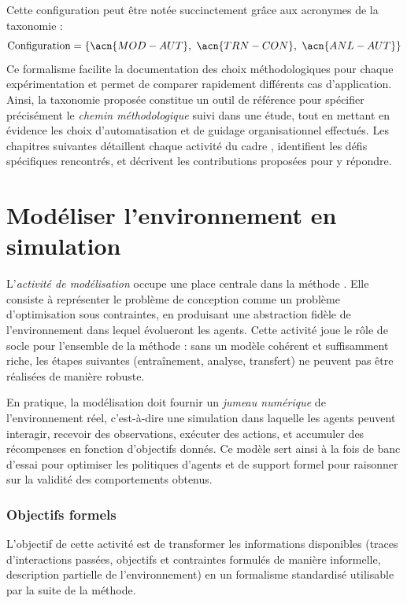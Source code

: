 Cette configuration peut être notée succinctement grâce aux acronymes de la taxonomie :
\[
  \text{Configuration} = \{\acn{MOD-AUT},\ \acn{TRN-CON},\ \acn{ANL-AUT}\}
\]
Ce formalisme facilite la documentation des choix méthodologiques pour chaque expérimentation et permet de comparer rapidement différents cas d'application.
%
Ainsi, la taxonomie proposée constitue un outil de référence pour spécifier précisément le \textit{chemin méthodologique} suivi dans une étude, tout en mettant en évidence les choix d'automatisation et de guidage organisationnel effectués.
Les chapitres suivantes détaillent chaque activité du cadre , identifient les défis spécifiques rencontrés, et décrivent les contributions proposées pour y répondre.


\clearpage
\thispagestyle{empty}
\null
\newpage


\chapter{Modéliser l'environnement en simulation}
\label{chap:modelling}

L'\textit{activité de modélisation} occupe une place centrale dans la méthode .
Elle consiste à représenter le problème de conception comme un problème d'optimisation sous contraintes, en produisant une abstraction fidèle de l'environnement dans lequel évolueront les agents.
Cette activité joue le rôle de socle pour l'ensemble de la méthode : sans un modèle cohérent et suffisamment riche, les étapes suivantes (entraînement, analyse, transfert) ne peuvent pas être réalisées de manière robuste.

En pratique, la modélisation doit fournir un \textit{jumeau numérique} de l'environnement réel, c'est-à-dire une simulation dans laquelle les agents peuvent interagir, recevoir des observations, exécuter des actions, et accumuler des récompenses en fonction d'objectifs donnés.
Ce modèle sert ainsi à la fois de banc d'essai pour optimiser les politiques d'agents et de support formel pour raisonner sur la validité des comportements obtenus.

\subsection*{Objectifs formels}
L'objectif de cette activité est de transformer les informations disponibles (traces d'interactions passées, objectifs et contraintes formulés de manière informelle, description partielle de l'environnement) en un formalisme standardisé utilisable par la suite de la méthode.

